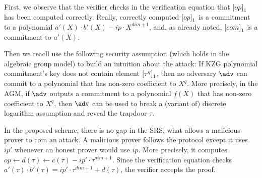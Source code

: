 \documentclass[runningheads,11pt,a4paper]{llncs}
\begin{document}
First, we observe that the verifier checks in the verification equation that $\left[op\right]_{1}$ has been computed correctly. Really, correctly computed $\left[op\right]_{1}$ is a commitment to a polynomial $a'(X) \cdot b'(X) - ip \cdot X^{dim + 1}$, and, as already noted, $\left[com\right]_{1}$ is a commitment to $a'(X)$.

Then we reacll use the following security assumption (which holds in the algebraic group model) to build an intuition about the attack: If KZG polynomial commitment's key does not contain element $\left[\tau^q\right]_{1}$, then no adversary $\adv$ can commit to a polynomial that has non-zero coefficient to $X^q$. More precisely, in the AGM, if $\adv$ outputs a commitment to a polynomial $f(X)$ that has non-zero coefficient to $X^q$, then $\adv$ can be used to break a (variant of) discrete logarithm assumption and reveal the trapdoor $\tau$. 


In the proposed scheme, there is no gap in the SRS, what allows a malicious prover to coin an attack. A malicious prover follows the protocol except it uses $ip'$ whenever an honest prover would use $ip$. More precisely, it computes $op \gets d(\tau) \gets c(\tau) - ip' \cdot \tau^{dim + 1}$. Since the verification equation checks $a'(\tau) \cdot b' (\tau) = ip' \cdot \tau^{dim + 1} + d(\tau)$, the verifier accepts the proof.
\end{document}
